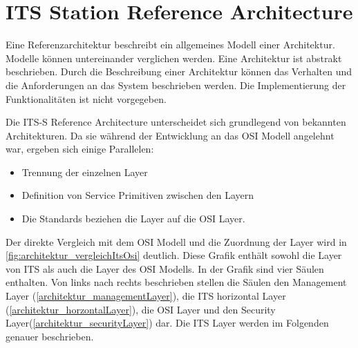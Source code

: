  
\section{ITS Station Reference Architecture}
Eine Referenzarchitektur beschreibt ein allgemeines Modell einer Architektur. Modelle können untereinander verglichen werden. Eine Architektur ist abstrakt beschrieben. Durch die Beschreibung einer Architektur können das Verhalten und die Anforderungen an das System beschrieben werden. Die Implementierung der Funktionalitäten ist nicht vorgegeben. 

Die \ac{ITS-S} Reference Architecture unterscheidet sich grundlegend von bekannten Architekturen. Da sie während der Entwicklung an das \ac{OSI} Modell angelehnt war, ergeben sich einige Parallelen:
\begin{itemize}
	\item Trennung der einzelnen Layer
	\item Definition von Service Primitiven zwischen den Layern
	\item Die Standards beziehen die Layer auf die \ac{OSI} Layer. 
\end{itemize}

Der direkte Vergleich mit dem \ac{OSI} Modell und die Zuordnung der Layer wird in \autoref{fig:architektur_vergleichItsOsi} deutlich. Diese Grafik enthält sowohl die Layer von \ac{ITS} als auch die Layer des \ac{OSI} Modells. In der Grafik sind  vier Säulen enthalten. Von links nach rechts beschrieben stellen die Säulen den Management Layer  (\autoref{architektur_managementLayer}), die \ac{ITS} horizontal Layer (\autoref{architektur_horzontalLayer}), die \ac{OSI} Layer und den Security Layer(\autoref{architektur_securityLayer}) dar. Die \ac{ITS} Layer werden im Folgenden genauer beschrieben. 

